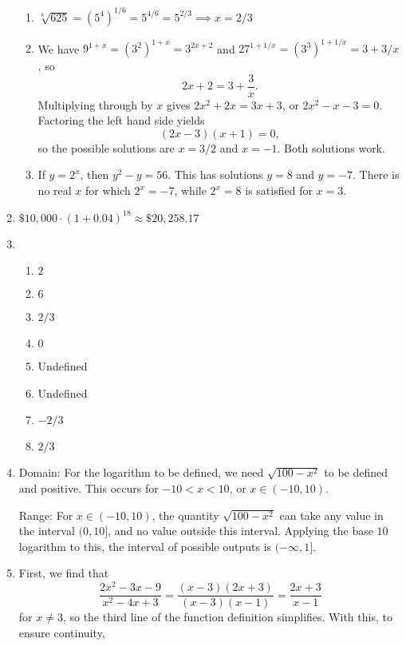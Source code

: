 \begin{enumerate}
\begin{enumerate}
\item $\sqrt[6]{625} = (5^4)^{1/6} = 5^{4/6} = 5^{2/3}\implies x = 2/3$
\item We have $9^{1 + x} = (3^2)^{1 + x} = 3^{2x + 2}$ and $27^{1 + 1/x} = (3^3)^{1 + 1/x} = 3 + 3/x$, so
\begin{equation*}
2x + 2 = 3 + \frac{3}{x}.
\end{equation*}
Multiplying through by $x$ gives $2x^2 + 2x = 3x + 3$, or $2x^2 - x - 3 = 0$. Factoring the left hand side yields
\begin{equation*}
(2x - 3)(x + 1) = 0,
\end{equation*}
so the possible solutions are $x = 3/2$ and $x = -1$. Both solutions work.
\item If $y = 2^x$, then $y^2 - y = 56$. This has solutions $y = 8$ and $y = -7$. There is no real $x$ for which $2^x = -7$, while $2^x = 8$ is satisfied for $x = 3$.
\end{enumerate}
\item $\displaystyle\$10{,}000\cdot\left(1 + 0.04\right)^{18}\approx\$20{,}258.17$
\item \begin{enumerate}
\item $2$
\item $6$
\item $2/3$
\item $0$
\item Undefined
\item Undefined 
\item $-2/3$
\item $2/3$
\end{enumerate}
\item Domain: For the logarithm to be defined, we need $\sqrt{100 - x^2}$ to be defined and positive. This occurs for $-10 < x < 10$, or $x\in\boxed{(-10,10)}$.\par
Range: For $x\in\boxed{(-10,10)}$, the quantity $\sqrt{100 - x^2}$ can take any value in the interval $(0, 10]$, and no value outside this interval. Applying the base $10$ logarithm to this, the interval of possible outputs is $\boxed{(-\infty, 1]}$.
\item First, we find that
\begin{equation*}
\frac{2x^2 - 3x - 9}{x^2 - 4x + 3} = \frac{(x - 3)(2x + 3)}{(x - 3)(x - 1)} = \frac{2x + 3}{x - 1}
\end{equation*}
for $x\neq 3$, so the third line of the function definition simplifies. With this, to ensure continuity,
\begin{align*}

\end{align*}
\end{enumerate}
